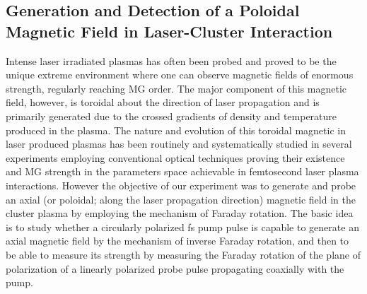 \documentclass[a4paper,12pt]{article}
\begin{document}
\subsection{Generation and Detection of a Poloidal Magnetic Field in Laser-Cluster Interaction}
Intense laser irradiated plasmas has often been probed and proved to be the unique extreme environment where one can observe magnetic fields of enormous strength, regularly reaching MG order\cite{wilks,magsudan}. The major component of this magnetic field, however, is toroidal about the direction of laser propagation and is primarily generated due to the crossed gradients of density and temperature produced in the plasma. The nature and evolution of this toroidal magnetic in laser produced plasmas has been routinely and systematically studied in several experiments employing conventional optical techniques proving their existence and MG strength in the parameters space achievable in femtosecond laser plasma interactions\cite{maggopal,magkahaly,maggourab,magshaikh}.
However the objective of our experiment was to generate and probe an axial (or poloidal; along the laser propagation direction) magnetic field in the cluster plasma by employing the mechanism of Faraday rotation. The basic idea is to study whether a circularly polarized fs pump pulse is capable to generate an axial magnetic field by the mechanism of inverse Faraday rotation, and then to be able to measure its strength by measuring the Faraday rotation of the plane of polarization of a linearly polarized probe pulse propagating coaxially with the pump.
\end{document}
